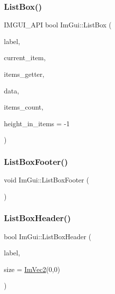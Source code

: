 \hypertarget{namespace_im_gui_ab5865b671bfa22738fac9ffd214470e2}{}\label{namespace_im_gui_ab5865b671bfa22738fac9ffd214470e2} 
\subsubsection{\texorpdfstring{List\+Box()}{ListBox()}\hspace{0.1cm}{\footnotesize\ttfamily [2/2]}}
{\footnotesize\ttfamily I\+M\+G\+U\+I\+\_\+\+A\+PI bool Im\+Gui\+::\+List\+Box (\begin{DoxyParamCaption}\item[{const char $\ast$}]{label,  }\item[{int $\ast$}]{current\+\_\+item,  }\item[{bool($\ast$)(void $\ast$data, int idx, const char $\ast$$\ast$out\+\_\+text)}]{items\+\_\+getter,  }\item[{void $\ast$}]{data,  }\item[{int}]{items\+\_\+count,  }\item[{int}]{height\+\_\+in\+\_\+items = {\ttfamily -\/1} }\end{DoxyParamCaption})}

\hypertarget{namespace_im_gui_a9a0a8f6a4a67280dce7bd91310a83a03}{}\label{namespace_im_gui_a9a0a8f6a4a67280dce7bd91310a83a03} 
\subsubsection{\texorpdfstring{List\+Box\+Footer()}{ListBoxFooter()}}
{\footnotesize\ttfamily void Im\+Gui\+::\+List\+Box\+Footer (\begin{DoxyParamCaption}{ }\end{DoxyParamCaption})}

\hypertarget{namespace_im_gui_a4003d6a6ab57f2fb43db80c6339a1aed}{}\label{namespace_im_gui_a4003d6a6ab57f2fb43db80c6339a1aed} 
\subsubsection{\texorpdfstring{List\+Box\+Header()}{ListBoxHeader()}\hspace{0.1cm}{\footnotesize\ttfamily [1/2]}}
{\footnotesize\ttfamily bool Im\+Gui\+::\+List\+Box\+Header (\begin{DoxyParamCaption}\item[{const char $\ast$}]{label,  }\item[{const \hyperlink{struct_im_vec2}{Im\+Vec2} \&}]{size = {\ttfamily \hyperlink{struct_im_vec2}{Im\+Vec2}(0,0)} }\end{DoxyParamCaption})}

